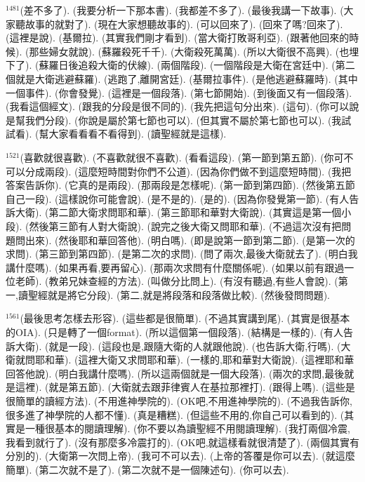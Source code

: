 \documentclass{book}
\begin{document}
$^{1481}$(差不多了).
(我要分析一下那本書).
(我都差不多了).
(最後我講一下故事).
(大家聽故事的就對了).
(現在大家想聽故事的).
(可以回來了).
(回來了嗎?回來了).
(這裡是說).
(基爾拉).
(其實我們剛才看到).
(當大衛打敗哥利亞).
(跟著他回來的時候).
(那些婦女就說).
(蘇羅殺死千千).
(大衛殺死萬萬).
(所以大衛很不高興).
(也埋下了).
(蘇羅日後追殺大衛的伏線).
(兩個階段).
(一個階段是大衛在宮廷中).
(第二個就是大衛逃避蘇羅).
(逃跑了,離開宮廷).
(基爾拉事件).
(是他逃避蘇羅時).
(其中一個事件).
(你會發覺).
(這裡是一個段落).
(第七節開始).
(到後面又有一個段落).
(我看這個經文).
(跟我的分段是很不同的).
(我先把這句分出來).
(這句).
(你可以說是幫我們分段).
(你說是屬於第七節也可以).
(但其實不屬於第七節也可以).
(我試試看).
(幫大家看看看不看得到).
(讀聖經就是這樣).

$^{1521}$(喜歡就很喜歡).
(不喜歡就很不喜歡).
(看看這段).
(第一節到第五節).
(你可不可以分成兩段).
(這麼短時間對你們不公道).
(因為你們做不到這麼短時間).
(我把答案告訴你).
(它真的是兩段).
(那兩段是怎樣呢).
(第一節到第四節).
(然後第五節自己一段).
(這樣說你可能會說).
(是不是的).
(是的).
(因為你發覺第一節).
(有人告訴大衛).
(第二節大衛求問耶和華).
(第三節耶和華對大衛說).
(其實這是第一個小段).
(然後第三節有人對大衛說).
(說完之後大衛又問耶和華).
(不過這次沒有把問題問出來).
(然後耶和華回答他).
(明白嗎).
(即是說第一節到第二節).
(是第一次的求問).
(第三節到第四節).
(是第二次的求問).
(問了兩次,最後大衛就去了).
(明白我講什麼嗎).
(如果再看,要再留心).
(那兩次求問有什麼關係呢).
(如果以前有跟過一位老師).
(教弟兄妹查經的方法).
(叫做分比問上).
(有沒有聽過,有些人會說).
(第一,讀聖經就是將它分段).
(第二,就是將段落和段落做比較).
(然後發問問題).

$^{1561}$(最後思考怎樣去形容).
(這些都是很簡單).
(不過其實講到尾).
(其實是很基本的OIA).
(只是轉了一個format).
(所以這個第一個段落).
(結構是一樣的).
(有人告訴大衛).
(就是一段).
(這段也是,跟隨大衛的人就跟他說).
(也告訴大衛,行嗎).
(大衛就問耶和華).
(這裡大衛又求問耶和華).
(一樣的,耶和華對大衛說).
(這裡耶和華回答他說).
(明白我講什麼嗎).
(所以這兩個就是一個大段落).
(兩次的求問,最後就是這裡).
(就是第五節).
(大衛就去跟菲律賓人在基拉那裡打).
(跟得上嗎).
(這些是很簡單的讀經方法).
(不用進神學院的).
(OK吧,不用進神學院的).
(不過我告訴你,很多進了神學院的人都不懂).
(真是糟糕).
(但這些不用的,你自己可以看到的).
(其實是一種很基本的閱讀理解).
(你不要以為讀聖經不用閱讀理解).
(我打兩個冷震,我看到就行了).
(沒有那麼多冷震打的).
(OK吧,就這樣看就很清楚了).
(兩個其實有分別的).
(大衛第一次問上帝).
(我可不可以去).
(上帝的答覆是你可以去).
(就這麼簡單).
(第二次就不是了).
(第二次就不是一個陳述句).
(你可以去).
\end{document}

